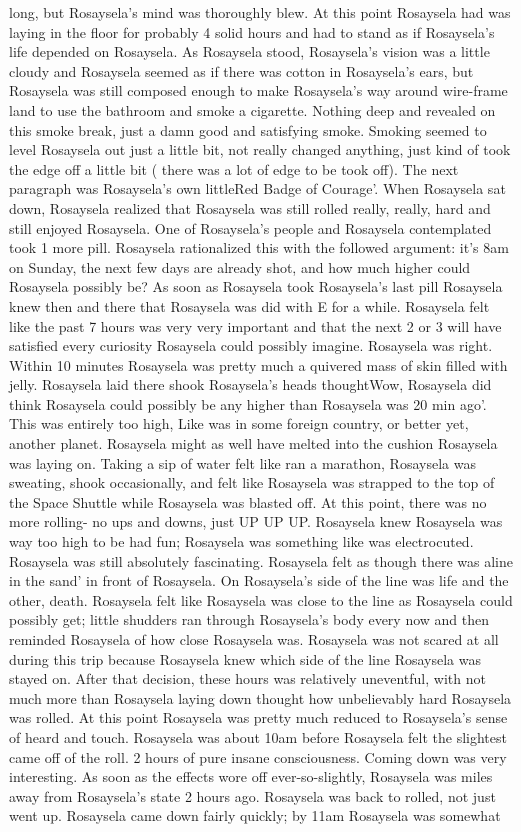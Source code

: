 \documentclass[12pt]{book}
\begin{document}
long, but Rosaysela's mind was thoroughly blew. At this point Rosaysela had was laying in the floor for probably 4 solid hours and had to stand as if Rosaysela's life depended on Rosaysela. As Rosaysela stood, Rosaysela's vision was a little cloudy and Rosaysela seemed as if there was cotton in Rosaysela's ears, but Rosaysela was still composed enough to make Rosaysela's way around wire-frame land to use the bathroom and smoke a cigarette. Nothing deep and revealed on this smoke break, just a damn good and satisfying smoke. Smoking seemed to level Rosaysela out just a little bit, not really changed anything, just kind of took the edge off a little bit ( there was a lot of edge to be took off). The next paragraph was Rosaysela's own littleRed Badge of Courage'. When Rosaysela sat down, Rosaysela realized that Rosaysela was still rolled really, really, hard and still enjoyed Rosaysela. One of Rosaysela's people and Rosaysela contemplated took 1 more pill. Rosaysela rationalized this with the followed argument: it's 8am on Sunday, the next few days are already shot, and how much higher could Rosaysela possibly be? As soon as Rosaysela took Rosaysela's last pill Rosaysela knew then and there that Rosaysela was did with E for a while. Rosaysela felt like the past 7 hours was very very important and that the next 2 or 3 will have satisfied every curiosity Rosaysela could possibly imagine. Rosaysela was right. Within 10 minutes Rosaysela was pretty much a quivered mass of skin filled with jelly. Rosaysela laid there shook Rosaysela's heads thoughtWow, Rosaysela did think Rosaysela could possibly be any higher than Rosaysela was 20 min ago'. This was entirely too high, Like was in some foreign country, or better yet, another planet. Rosaysela might as well have melted into the cushion Rosaysela was laying on. Taking a sip of water felt like ran a marathon, Rosaysela was sweating, shook occasionally, and felt like Rosaysela was strapped to the top of the Space Shuttle while Rosaysela was blasted off. At this point, there was no more rolling- no ups and downs, just UP UP UP. Rosaysela knew Rosaysela was way too high to be had fun; Rosaysela was something like was electrocuted. Rosaysela was still absolutely fascinating. Rosaysela felt as though there was aline in the sand' in front of Rosaysela. On Rosaysela's side of the line was life and the other, death. Rosaysela felt like Rosaysela was close to the line as Rosaysela could possibly get; little shudders ran through Rosaysela's body every now and then reminded Rosaysela of how close Rosaysela was. Rosaysela was not scared at all during this trip because Rosaysela knew which side of the line Rosaysela was stayed on. After that decision, these hours was relatively uneventful, with not much more than Rosaysela laying down thought how unbelievably hard Rosaysela was rolled. At this point Rosaysela was pretty much reduced to Rosaysela's sense of heard and touch. Rosaysela was about 10am before Rosaysela felt the slightest came off of the roll. 2 hours of pure insane consciousness. Coming down was very interesting. As soon as the effects wore off ever-so-slightly, Rosaysela was miles away from Rosaysela's state 2 hours ago. Rosaysela was back to rolled, not just went up. Rosaysela came down fairly quickly; by 11am Rosaysela was somewhat 
\end{document}
